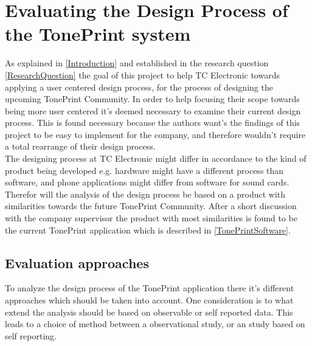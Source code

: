 \chapter{Evaluating the Design Process of the TonePrint system}
\label{HeuristicEvaluation}
As explained in \autoref{Introduction} and established in the research question \autoref{ResearchQuestion} the goal of this project to help TC Electronic towards applying a user centered design process, for the process of designing the upcoming TonePrint Community. In order to help focusing their scope towards being more user centered it's deemed necessary to examine their current design process. This is found necessary because the authors want's the findings of this project to be easy to implement for the company, and therefore wouldn't require a total rearrange of their design process. \\
The designing process at TC Electronic might differ in accordance to the kind of product being developed e.g. hardware might have a different process than software, and  phone applications might differ from software for sound cards. Therefor will the analysis of the design process be based on a product with similarities towards the future TonePrint Community. After a short discussion with the company supervisor the product with most similarities is found to be the current TonePrint application which is described in \autoref{TonePrintSoftware}. 

\section{Evaluation approaches}
\label{AnalyzingTonePrintDesign}
To analyze the design process of the TonePrint application there it's different approaches which should be taken into account. One consideration is to what extend the analysis should be based on observable or self reported data. This leads to a choice of method between a observational study, or an study based on self reporting. 


